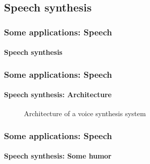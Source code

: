 \documentclass[xcolor=table]{beamer}
\begin{document}
\subsection{Speech synthesis}

\begin{frame}
	\frametitle{Some applications: Speech}
	\framesubtitle{Speech synthesis}
\end{frame}

\begin{frame}
	\frametitle{Some applications: Speech}
	\framesubtitle{Speech synthesis: Architecture}
	\begin{figure}
		\centering
		\caption{Architecture of a voice synthesis system \cite{2017-Hinterleitner}}
	\end{figure}
\end{frame}


\begin{frame}
	\frametitle{Some applications: Speech}
	\framesubtitle{Speech synthesis: Some humor}
	\begin{center}
	\end{center}
\end{frame}


\end{document}
